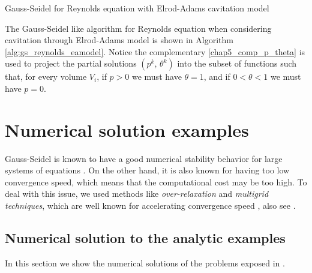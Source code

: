 \begin{algorithm}[h]\small
\caption{Gauss-Seidel for Reynolds equation with Elrod-Adams cavitation model}
\label{alg:gs_reynolds_eamodel}
\end{algorithm}

The Gauss-Seidel like algorithm for Reynolds equation when considering cavitation through Elrod-Adams model is shown in Algorithm \ref{alg:gs_reynolds_eamodel}. Notice the complementary \eqref{chap5_comp_p_theta} is used to project the partial solutions $(p^k,\,\theta^k)$ into the subset of functions such that, for every volume $V_i$,
if $p>0$ we must have $\theta=1$, and if $0<\theta <1$ we must have $p=0$.
\section{Numerical solution examples}\label{sec:num_numerical_sol_examples}
Gauss-Seidel is known to have a good numerical stability behavior for large systems of equations \cite{golub1996}. On the other hand, it is also known for having too low convergence speed, which means that the computational cost may be too high. To deal with this issue, we used methods like \emph{over-relaxation} and \emph{multigrid techniques}, which are well known for accelerating convergence speed \cite{fulton1986}, also see \cite{checophd}.

\subsection{Numerical solution to the analytic examples}
In this section we show the numerical solutions of the problems exposed in .

